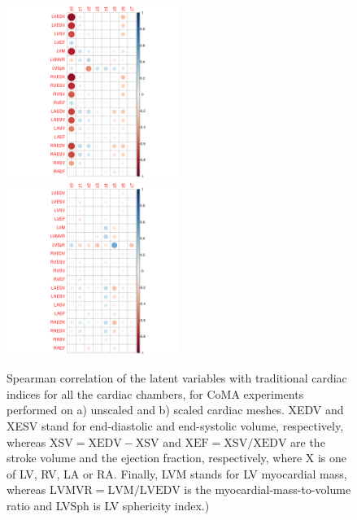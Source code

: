 \begin{figure}[ht!]
\includegraphics[width=0.5\textwidth]{figs/correlation/experiment_2_vs_cardiac_indices}
\includegraphics[width=0.5\textwidth]{figs/correlation/experiment_1_vs_cardiac_indices}
\caption{Spearman correlation of the latent variables with traditional cardiac indices for all the cardiac chambers, for CoMA experiments performed on a) unscaled and b) scaled cardiac meshes. XEDV and XESV stand for end-diastolic and end-systolic volume, respectively, whereas $\text{XSV}=\text{XEDV}-\text{XSV}$ and $\text{XEF}=\text{XSV}/\text{XEDV}$ are the stroke volume and the ejection fraction, respectively, where X is one of LV, RV, LA or RA. Finally, LVM stands for LV myocardial mass, whereas $\text{LVMVR}=\text{LVM}/\text{LVEDV}$ is the myocardial-mass-to-volume ratio and LVSph is LV sphericity index.)}
\label{fig:relation_to_indices}
\end{figure}



